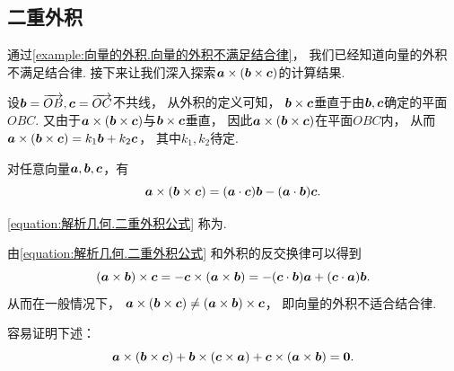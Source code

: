 \subsection{二重外积}
通过\cref{example:向量的外积.向量的外积不满足结合律}，
我们已经知道向量的外积不满足结合律.
接下来让我们深入探索\(\boldsymbol{a}\times(\boldsymbol{b}\times\boldsymbol{c})\)的计算结果.

设\(\boldsymbol{b}=\overrightarrow{OB},\boldsymbol{c}=\overrightarrow{OC}\)不共线，
从外积的定义可知，
\(\boldsymbol{b}\times\boldsymbol{c}\)垂直于由\(\boldsymbol{b},\boldsymbol{c}\)确定的平面\(OBC\).
又由于\(\boldsymbol{a}\times(\boldsymbol{b}\times\boldsymbol{c})\)与\(\boldsymbol{b}\times\boldsymbol{c}\)垂直，
因此\(\boldsymbol{a}\times(\boldsymbol{b}\times\boldsymbol{c})\)在平面\(OBC\)内，
从而\(\boldsymbol{a}\times(\boldsymbol{b}\times\boldsymbol{c}) = k_1 \boldsymbol{b} + k_2 \boldsymbol{c}\)，
其中\(k_1,k_2\)待定.

\begin{theorem}
对任意向量\(\boldsymbol{a},\boldsymbol{b},\boldsymbol{c}\)，有
\begin{equation}\label{equation:解析几何.二重外积公式}
	\boldsymbol{a}\times(\boldsymbol{b}\times\boldsymbol{c})
	= (\boldsymbol{a}\cdot\boldsymbol{c}) \boldsymbol{b}
	- (\boldsymbol{a}\cdot\boldsymbol{b}) \boldsymbol{c}.
\end{equation}
\end{theorem}
\cref{equation:解析几何.二重外积公式}
称为.

由\cref{equation:解析几何.二重外积公式}
和外积的反交换律可以得到\begin{equation*}
	(\boldsymbol{a}\times\boldsymbol{b})\times\boldsymbol{c}
	= -\boldsymbol{c}\times(\boldsymbol{a}\times\boldsymbol{b})
	= -(\boldsymbol{c}\cdot\boldsymbol{b}) \boldsymbol{a}
	+ (\boldsymbol{c}\cdot\boldsymbol{a}) \boldsymbol{b}.
\end{equation*}
从而在一般情况下，
\(\boldsymbol{a}\times(\boldsymbol{b}\times\boldsymbol{c})
\neq
(\boldsymbol{a}\times\boldsymbol{b})\times\boldsymbol{c}\)，
即向量的外积不适合结合律.

容易证明下述：
\begin{equation}\label{equation:解析几何.雅克比等式}
	\boldsymbol{a}\times(\boldsymbol{b}\times\boldsymbol{c})
	+ \boldsymbol{b}\times(\boldsymbol{c}\times\boldsymbol{a})
	+ \boldsymbol{c}\times(\boldsymbol{a}\times\boldsymbol{b})
	= \boldsymbol{0}.
\end{equation}

